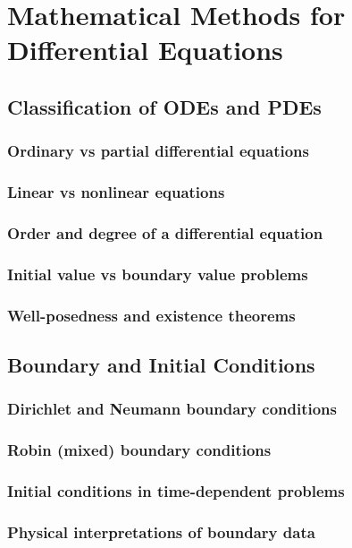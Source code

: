 ﻿\chapter{Mathematical Methods for Differential Equations}

\section{Classification of ODEs and PDEs}
\subsection{Ordinary vs partial differential equations}
\subsection{Linear vs nonlinear equations}
\subsection{Order and degree of a differential equation}
\subsection{Initial value vs boundary value problems}
\subsection{Well-posedness and existence theorems}

\section{Boundary and Initial Conditions}
\subsection{Dirichlet and Neumann boundary conditions}
\subsection{Robin (mixed) boundary conditions}
\subsection{Initial conditions in time-dependent problems}
\subsection{Physical interpretations of boundary data}

